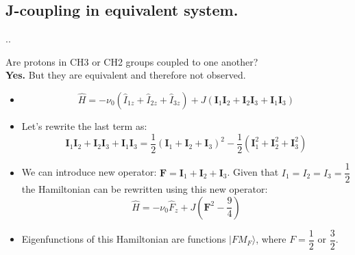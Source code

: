 \documentclass{beamer}
\begin{document}
\subsection{J-coupling in equivalent system.}
\begin{frame}{\thesection.\thesubsection. \insertsubsection}

Are protons in CH3 or CH2 groups coupled to one another? \\
\textbf{Yes.} But they are equivalent and therefore not observed.

\begin{itemize}[<+>]
	\item 
	
	\begin{equation}
	\hat{H} = - \nu_0 (\hat{I}_{1z} + \hat{I}_{2z}+ \hat{I}_{3z}) + J (\bm{I}_1 \bm{I}_2 + \bm{I}_2 \bm{I}_3  + \bm{I}_1 \bm{I}_3 )
	\end{equation}
	
	\item
	Let's rewrite the last term as:
	\begin{equation}
	\bm{I}_1 \bm{I}_2 + \bm{I}_2 \bm{I}_3  + \bm{I}_1 \bm{I}_3 = \dfrac{1}{2} (\bm{I}_1 + \bm{I}_2 + \bm{I}_3 )^2 - \dfrac{1}{2} ( \bm{I}_1^2 + \bm{I}_2^2 + \bm{I}_3^2)
	\end{equation}
	
	\item	
	We can introduce new operator: $\bm{F} =\bm{I}_1 + \bm{I}_2 + \bm{I}_3$. Given that $I_1=I_2=I_3=\dfrac{1}{2}$ the Hamiltonian can be rewritten using this new operator:
	\begin{equation}
	\hat{H} = - \nu_0 \hat{F}_{z} + J (\bm{F}^2 - \dfrac{9}{4} )    
	\end{equation}
	
	\item	
	Eigenfunctions of this Hamiltonian are functions $\vert F M_F \rangle$, where $F=\dfrac{1}{2}$ or $\dfrac{3}{2}$.
\end{itemize}

\end{frame}
\end{document}
